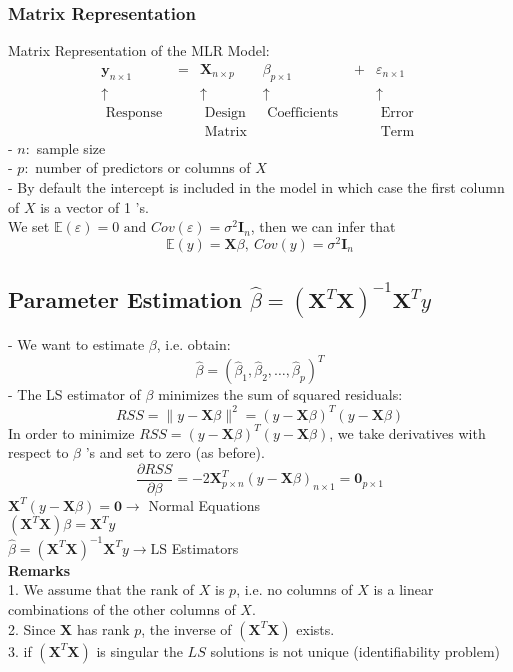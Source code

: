 \documentclass[11pt,a4paper]{article}
\begin{document}
\subsubsection{Matrix Representation}
Matrix Representation of the MLR Model:
$$\begin{array}{cccccc}\mathbf{y}_{n \times 1} & = & \mathbf{X}_{n \times p} & \beta_{p \times 1} & + & \varepsilon_{n \times 1} \\ \uparrow & &\uparrow & \uparrow & &\uparrow \\ \text { Response }& & \text { Design } & \text { Coefficients } & &\text { Error } \\ & & \text { Matrix } & & &\text { Term }\end{array}$$
- $n:$ sample size\\
- $p:$ number of predictors or columns of $X$\\
- By default the intercept is included in the model in which case the first column of $X$ is a vector of 1 's.\\
We set $\mathbb{E}(\varepsilon)=0\text{ and }Cov(\varepsilon)=\sigma^2 \mathbf{I}_n$, then we can infer that
$$\mathbb{E}(y)= \mathbf{X}\beta,\ Cov(y)=\sigma^2 \mathbf{I}_n$$

\subsection{Parameter Estimation $\hat{\beta}=\left(\mathbf{X}^{T} \mathbf{X}\right)^{-1} \mathbf{X}^{T} y$}
- We want to estimate $\beta$, i.e. obtain:
$$
\hat{\beta}=\left(\hat{\beta}_{1}, \hat{\beta}_{2}, \ldots, \hat{\beta}_{p}\right)^{T}
$$
- The LS estimator of $\beta$ minimizes the sum of squared residuals:
$$
R S S=\|y-\mathbf{X} \beta\|^{2}=(y-\mathbf{X} \beta)^{T}(y-\mathbf{X} \beta)
$$
In order to minimize $R S S=(y-\mathbf{X} \beta)^{T}(y-\mathbf{X} \beta)$, we take derivatives with respect to $\beta$ 's and set to zero (as before).\\
$$\frac{\partial R S S}{\partial \beta}=-2 \mathbf{X}_{p \times n}^{T}(y-\mathbf{X} \beta)_{n \times 1}=\mathbf{0}_{p \times 1}$$
$\mathbf{X}^{T}(y-\mathbf{X} \beta)=\mathbf{0} \longrightarrow$ Normal Equations\\
$\left(\mathbf{X}^{T} \mathbf{X}\right) \beta=\mathbf{X}^{T} y$\\
$\hat{\beta}=\left(\mathbf{X}^{T} \mathbf{X}\right)^{-1} \mathbf{X}^{T} y \rightarrow \mathrm{LS}$ Estimators\\
\textbf{Remarks}\\
1. We assume that the rank of $X$ is $p$, i.e. no columns of $X$ is a linear combinations of the other columns of $X$.\\
2. Since $\mathbf{X}$ has rank $p$, the inverse of $\left(\mathbf{X}^{T} \mathbf{X}\right)$ exists.\\
3. if $\left(\mathbf{X}^{T} \mathbf{X}\right)$ is singular the $LS$ solutions is not unique (identiﬁability problem)
\end{document}
